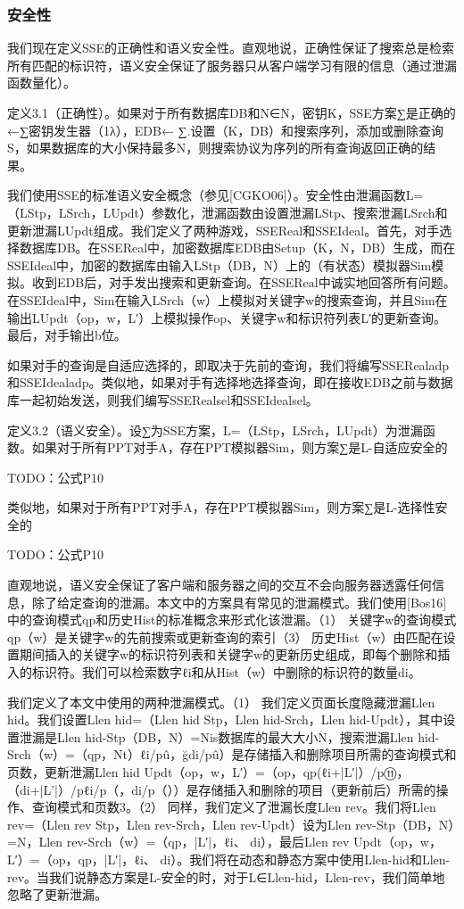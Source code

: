 \documentclass[UTF8]{article}
\begin{document}
\subsubsection{安全性}
我们现在定义SSE的正确性和语义安全性。直观地说，正确性保证了搜索总是检索所有匹配的标识符，语义安全保证了服务器只从客户端学习有限的信息（通过泄漏函数量化）。

定义3.1（正确性）。如果对于所有数据库DB和N∈N，密钥K，SSE方案∑是正确的←∑密钥发生器（1λ），EDB← ∑.设置（K，DB）和搜索序列，添加或删除查询S，如果数据库的大小保持最多N，则搜索协议为序列的所有查询返回正确的结果。

我们使用SSE的标准语义安全概念（参见[CGKO06]）。安全性由泄漏函数L=（LStp，LSrch，LUpdt）参数化，泄漏函数由设置泄漏LStp、搜索泄漏LSrch和更新泄漏LUpdt组成。我们定义了两种游戏，SSEReal和SSEIdeal。首先，对手选择数据库DB。在SSEReal中，加密数据库EDB由Setup（K，N，DB）生成，而在SSEIdeal中，加密的数据库由输入LStp（DB，N）上的（有状态）模拟器Sim模拟。收到EDB后，对手发出搜索和更新查询。在SSEReal中诚实地回答所有问题。在SSEIdeal中，Sim在输入LSrch（w）上模拟对关键字w的搜索查询，并且Sim在输出LUpdt（op，w，L′）上模拟操作op、关键字w和标识符列表L′的更新查询。最后，对手输出b位。

如果对手的查询是自适应选择的，即取决于先前的查询，我们将编写SSERealadp和SSEIdealadp。类似地，如果对手有选择地选择查询，即在接收EDB之前与数据库一起初始发送，则我们编写SSERealsel和SSEIdealsel。

定义3.2（语义安全）。设∑为SSE方案，L=（LStp，LSrch，LUpdt）为泄漏函数。如果对于所有PPT对手A，存在PPT模拟器Sim，则方案∑是L-自适应安全的

TODO：公式P10

类似地，如果对于所有PPT对手A，存在PPT模拟器Sim，则方案∑是L-选择性安全的

TODO：公式P10

直观地说，语义安全保证了客户端和服务器之间的交互不会向服务器透露任何信息，除了给定查询的泄漏。本文中的方案具有常见的泄漏模式。我们使用[Bos16]中的查询模式qp和历史Hist的标准概念来形式化该泄漏。（1） 关键字w的查询模式qp（w）是关键字w的先前搜索或更新查询的索引（3） 历史Hist（w）由匹配在设置期间插入的关键字w的标识符列表和关键字w的更新历史组成，即每个删除和插入的标识符。我们可以检索数字ℓi和从Hist（w）中删除的标识符的数量di。

我们定义了本文中使用的两种泄漏模式。（1） 我们定义页面长度隐藏泄漏Llen hid。我们设置Llen hid=（Llen hid Stp，Llen hid-Srch，Llen hid-Updt），其中设置泄漏是Llen hid-Stp（DB，N）=Nis数据库的最大大小N，搜索泄漏Llen hid-Srch（w）=（qp，Nt）ℓi/pû，ğdi/pû）是存储插入和删除项目所需的查询模式和页数，更新泄漏Llen hid Updt（op，w，L′）=（op，qp(ℓi+|L′|）/p⑪，（di+|L’|）/pℓi/p（，di/p（））是存储插入和删除的项目（更新前后）所需的操作、查询模式和页数3。（2） 同样，我们定义了泄漏长度Llen rev。我们将Llen rev=（Llen rev Stp，Llen rev-Srch，Llen rev-Updt）设为Llen rev-Stp（DB，N）=N，Llen rev-Srch（w）=（qp，|L′|，ℓi、 di），最后Llen rev Updt（op，w，L′）=（op，qp，|L′|，ℓi、 di）。我们将在动态和静态方案中使用Llen-hid和Llen-rev。当我们说静态方案是L-安全的时，对于L∈{Llen-hid，Llen-rev}，我们简单地忽略了更新泄漏。
\end{document}
